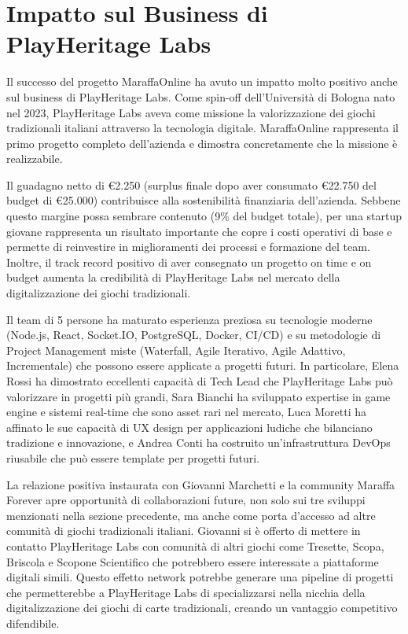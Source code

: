 \section{Impatto sul Business di PlayHeritage Labs}

Il successo del progetto MaraffaOnline ha avuto un impatto molto positivo anche sul business di PlayHeritage Labs. Come spin-off dell'Università di Bologna nato nel 2023, PlayHeritage Labs aveva come missione la valorizzazione dei giochi tradizionali italiani attraverso la tecnologia digitale. MaraffaOnline rappresenta il primo progetto completo dell'azienda e dimostra concretamente che la missione è realizzabile.

Il guadagno netto di €2.250 (surplus finale dopo aver consumato €22.750 del budget di €25.000) contribuisce alla sostenibilità finanziaria dell'azienda. Sebbene questo margine possa sembrare contenuto (9\% del budget totale), per una startup giovane rappresenta un risultato importante che copre i costi operativi di base e permette di reinvestire in miglioramenti dei processi e formazione del team. Inoltre, il track record positivo di aver consegnato un progetto on time e on budget aumenta la credibilità di PlayHeritage Labs nel mercato della digitalizzazione dei giochi tradizionali.

Il team di 5 persone ha maturato esperienza preziosa su tecnologie moderne (Node.js, React, Socket.IO, PostgreSQL, Docker, CI/CD) e su metodologie di Project Management miste (Waterfall, Agile Iterativo, Agile Adattivo, Incrementale) che possono essere applicate a progetti futuri. In particolare, Elena Rossi ha dimostrato eccellenti capacità di Tech Lead che PlayHeritage Labs può valorizzare in progetti più grandi, Sara Bianchi ha sviluppato expertise in game engine e sistemi real-time che sono asset rari nel mercato, Luca Moretti ha affinato le sue capacità di UX design per applicazioni ludiche che bilanciano tradizione e innovazione, e Andrea Conti ha costruito un'infrastruttura DevOps riusabile che può essere template per progetti futuri.

La relazione positiva instaurata con Giovanni Marchetti e la community Maraffa Forever apre opportunità di collaborazioni future, non solo sui tre sviluppi menzionati nella sezione precedente, ma anche come porta d'accesso ad altre comunità di giochi tradizionali italiani. Giovanni si è offerto di mettere in contatto PlayHeritage Labs con comunità di altri giochi come Tresette, Scopa, Briscola e Scopone Scientifico che potrebbero essere interessate a piattaforme digitali simili. Questo effetto network potrebbe generare una pipeline di progetti che permetterebbe a PlayHeritage Labs di specializzarsi nella nicchia della digitalizzazione dei giochi di carte tradizionali, creando un vantaggio competitivo difendibile.

